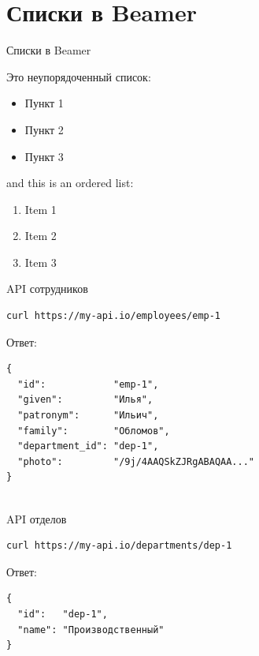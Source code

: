 \documentclass{beamer}
\begin{document}
\section{Списки в Beamer}
\begin{frame}{Списки в Beamer}

Это неупорядоченный список:
\begin{itemize}
    \item Пункт 1
    \item Пункт 2
    \item Пункт 3
\end{itemize}

and this is an ordered list:
\begin{enumerate}
    \item Item 1
    \item Item 2
    \item Item 3
\end{enumerate}

\end{frame}


\begin{frame}[fragile]{API сотрудников}
\begin{verbatim}
curl https://my-api.io/employees/emp-1
\end{verbatim}

Ответ:

\begin{verbatim}
{
  "id":            "emp-1",
  "given":         "Илья",
  "patronym":      "Ильич",
  "family":        "Обломов",
  "department_id": "dep-1",
  "photo":         "/9j/4AAQSkZJRgABAQAA..."
}
 
\end{verbatim}

\end{frame}

\begin{frame}[fragile]{API отделов}
\begin{verbatim}
curl https://my-api.io/departments/dep-1
\end{verbatim}

Ответ:

\begin{verbatim}
{
  "id":   "dep-1",
  "name": "Производственный"
}
\end{verbatim}

\end{frame}

\end{document}
